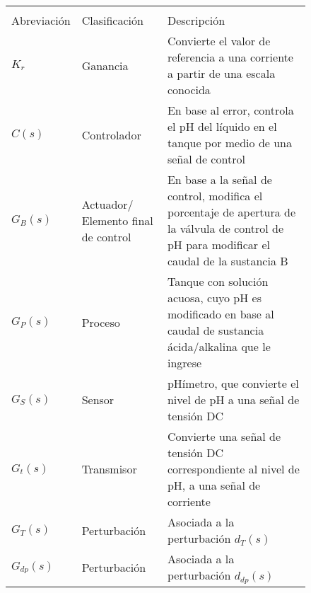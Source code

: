 \begin{figure}[!h]
    \centering
    \setlength\extrarowheight{3mm}
    \begin{tabular}{>{\centering\arraybackslash}p{3cm}p{3cm}p{10cm}}
        \toprule\\[-2.5em]
        Abreviación & Clasificación & Descripción\\
        \midrule
        $K_r$ & Ganancia & Convierte el valor de referencia a una corriente a partir de una escala conocida\\
        $C(s)$ & Controlador & En base al error, controla el pH del líquido en el tanque por medio de una señal de control\\
        $G_B(s)$ & Actuador/ \newline Elemento final de control & En base a la señal de control, modifica el porcentaje de apertura de la válvula de control de pH para modificar el caudal de la sustancia B\\
        $G_P(s)$ & Proceso & Tanque con solución acuosa, cuyo pH es modificado en base al caudal de sustancia ácida/alkalina que le ingrese\\
        $G_S(s)$ & Sensor & pHímetro, que convierte el nivel de pH a una señal de tensión DC\\
        $G_t(s)$ & Transmisor & Convierte una señal de tensión DC correspondiente al nivel de pH, a una señal de corriente\\
        $G_T(s)$ & Perturbación & Asociada a la perturbación $d_T(s)$\\
        $G_{dp}(s)$ & Perturbación & Asociada a la perturbación $d_{dp}(s)$\\
        \bottomrule
    \end{tabular}
    \label{t1}
\end{figure}

